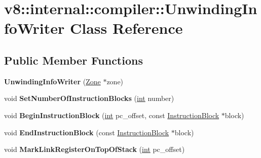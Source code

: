 \hypertarget{classv8_1_1internal_1_1compiler_1_1UnwindingInfoWriter}{}\section{v8\+:\+:internal\+:\+:compiler\+:\+:Unwinding\+Info\+Writer Class Reference}
\label{classv8_1_1internal_1_1compiler_1_1UnwindingInfoWriter}
\subsection*{Public Member Functions}
\begin{DoxyCompactItemize}
\item 
\mbox{\label{classv8_1_1internal_1_1compiler_1_1UnwindingInfoWriter_ab9baf225b2104df264b3cf7b1a5b7cce}} 
{\bfseries Unwinding\+Info\+Writer} (\mbox{\hyperlink{classv8_1_1internal_1_1Zone}{Zone}} $\ast$zone)
\item 
\mbox{\label{classv8_1_1internal_1_1compiler_1_1UnwindingInfoWriter_a5480ac05525eca5283126ea5e3748561}} 
void {\bfseries Set\+Number\+Of\+Instruction\+Blocks} (\mbox{\hyperlink{classint}{int}} number)
\item 
\mbox{\label{classv8_1_1internal_1_1compiler_1_1UnwindingInfoWriter_a4fe6a694e0d3b6d0472459af40eba0ab}} 
void {\bfseries Begin\+Instruction\+Block} (\mbox{\hyperlink{classint}{int}} pc\+\_\+offset, const \mbox{\hyperlink{classv8_1_1internal_1_1compiler_1_1InstructionBlock}{Instruction\+Block}} $\ast$block)
\item 
\mbox{\label{classv8_1_1internal_1_1compiler_1_1UnwindingInfoWriter_afc7ef781f2d55ef125a3dd4697c0164e}} 
void {\bfseries End\+Instruction\+Block} (const \mbox{\hyperlink{classv8_1_1internal_1_1compiler_1_1InstructionBlock}{Instruction\+Block}} $\ast$block)
\item 
\mbox{\label{classv8_1_1internal_1_1compiler_1_1UnwindingInfoWriter_a89fc5c79255c6242455e8446cb1c2174}} 
void {\bfseries Mark\+Link\+Register\+On\+Top\+Of\+Stack} (\mbox{\hyperlink{classint}{int}} pc\+\_\+offset)

\end{DoxyCompactItemize}
